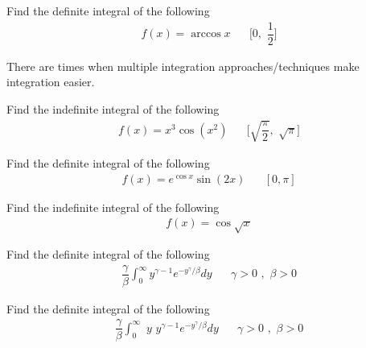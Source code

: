 \begin{exercise}
Find the definite integral of the following
\begin{align*}
    f(x) = \arccos x \hspace{20pt} \Big[0, \hspace{4pt} \dfrac{1}{2}\Big]
\end{align*}
\end{exercise}

\begin{note}
There are times when multiple integration approaches/techniques make integration easier.
\end{note}

\begin{exercise}
Find the indefinite integral of the following
\begin{align*}
    f(x) = x^{3} \cos(x^{2}) \hspace{20pt} \Big[\sqrt{\dfrac{\pi}{2}}, \hspace{4pt} \sqrt{\pi} \Big]
\end{align*}
\end{exercise}

\begin{exercise}
Find the definite integral of the following
\begin{align*}
    f(x) = e^{\cos x} \sin(2x) \hspace{20pt} [0, \pi]
\end{align*}
\end{exercise}

\begin{exercise}
Find the indefinite integral of the following
\begin{align*}
    f(x) = \cos \sqrt{x}
\end{align*}
\end{exercise}

\begin{exercise}
    Find the definite integral of the following
    \begin{align*}
        \dfrac{\gamma}{\beta} \int_{0}^{\infty} y^{\gamma - 1} e^{-y^{\gamma}/\beta} dy \hspace{20pt} \gamma > 0 \hspace{4pt} , \hspace{4pt} \beta > 0
    \end{align*}
\end{exercise}

\begin{exercise}
    Find the definite integral of the following
    \begin{align*}
        \dfrac{\gamma}{\beta} \int_{0}^{\infty} \hspace{4pt} y \hspace{4pt} y^{\gamma - 1} e^{-y^{\gamma}/\beta} dy \hspace{20pt} \gamma > 0 \hspace{4pt} , \hspace{4pt} \beta > 0
    \end{align*}
\end{exercise}

